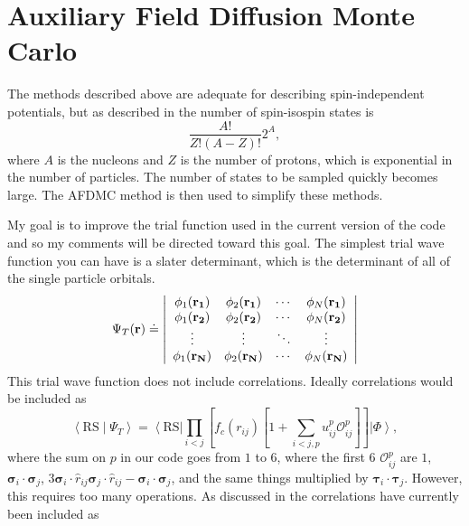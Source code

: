 \section*{Auxiliary Field Diffusion Monte Carlo}
The methods described above are adequate for describing spin-independent potentials, but as described in \cite{schmidt1999} the number of spin-isospin states is 
\begin{equation}
  \frac{A!}{Z!(A-Z)!}2^A,
\end{equation}
where $A$ is the nucleons and $Z$ is the number of protons, which is exponential in the number of particles. The number of states to be sampled quickly becomes large. The AFDMC method is then used to simplify these methods.

My goal is to improve the trial function used in the current version of the code and so my comments will be directed toward this goal. The simplest trial wave function you can have is a slater determinant, which is the determinant of all of the single particle orbitals.
\begin{equation}
  \Psi_T(\mathbf{r}) \doteq \left| \\
  \begin{array}{cccc}
    \phi_1(\mathbf{r_1}) & \phi_2(\mathbf{r_1})  & \cdots & \phi_N(\mathbf{r_1})  \\
    \phi_1(\mathbf{r_2})  & \phi_2(\mathbf{r_2})  & \cdots & \phi_N(\mathbf{r_2})  \\
    \vdots & \vdots & \ddots & \vdots \\
    \phi_1(\mathbf{r_N})  & \phi_2(\mathbf{r_N})  & \cdots & \phi_N(\mathbf{r_N})  
  \end{array} \right|
\end{equation} 
This trial wave function does not include correlations. Ideally correlations would be included as
\begin{equation}
  \left<\mathrm{RS}\middle|\Psi_T\right> = \left<\mathrm{RS}\right| \prod\limits_{i<j}\left[f_c(r_{ij})\left[1+\sum\limits_{i<j,p}u_{ij}^p\mathcal{O}_{ij}^p\right]\right] \left|\Phi\right>,
  \label{equ:corrfull}
\end{equation}
where the sum on $p$ in our code goes from $1$ to $6$, where the first 6 $\mathcal{O}_{ij}^p$ are $1$, $\mathbf{\sigma}_i \cdot \mathbf{\sigma}_j$, $3\mathbf{\sigma}_i \cdot \hat{r}_{ij}\mathbf{\sigma}_j \cdot \hat{r}_{ij} - \mathbf{\sigma}_i \cdot \mathbf{\sigma}_j$, and the same things multiplied by $\mathbf{\tau}_i \cdot \mathbf{\tau}_j$. However, this requires too many operations. As discussed in \cite{gandolfi2014} the correlations have currently been included as
